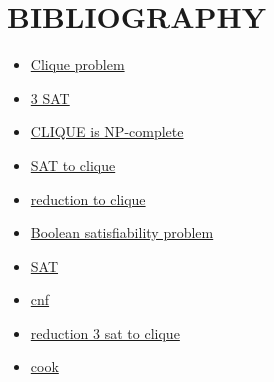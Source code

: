 \documentclass[table]{article}
\begin{document}
\newpage\section{BIBLIOGRAPHY}
\begin{itemize}
\item\href{https://en.wikipedia.org/wiki/Clique_problem}{Clique problem}    
\item\href{http://www.cs.ecu.edu/karl/6420/spr16/Notes/NPcomplete/3sat.html}{3 SAT}    
\item\href{https://www.geeksforgeeks.org/proof-that-clique-decision-problem-is-np-complete}{CLIQUE is NP-complete}    
\item\href{https://opendsa-server.cs.vt.edu/ODSA/Books/Everything/html/threeSAT_to_clique.html}{SAT to clique}    
\item\href{https://paperzz.com/doc/7301675/3sat-reduction-to-clique}{reduction to clique} 
\item\href{https://en.wikipedia.org/wiki/Boolean_satisfiability_problem}{Boolean satisfiability problem}
\item\href{https://www.cs.umd.edu/~gasarch/TOPICS/sat/SATtalk.pdf}{SAT}
\item\href{https://logic4free.informatik.uni-kiel.de/llocs/Conjunctive_normal_form_(propositional_logic)}{cnf}
\item\href{https://cs.stackexchange.com/questions/70531/reduction-3sat-and-clique}{reduction 3 sat to clique}
\item\href{https://dl.acm.org/doi/10.1145/800157.805047}{cook}
\end{itemize}
\end{document}
